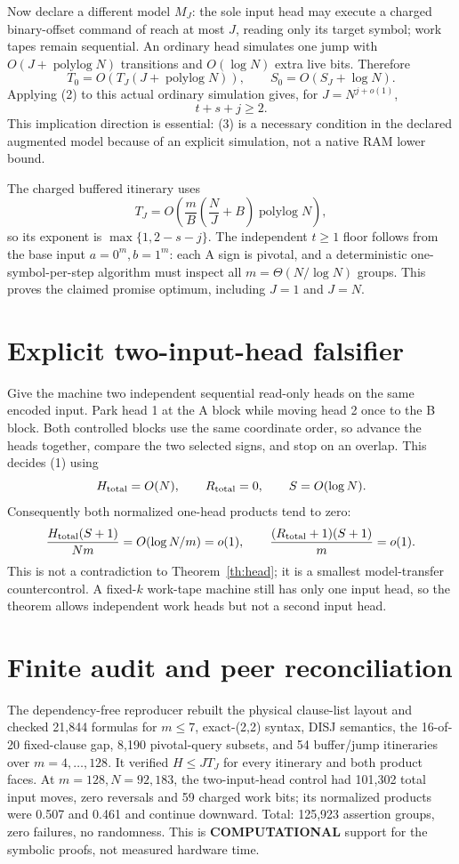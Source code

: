 \documentclass[11pt]{article}
\begin{document}
Now declare a different model \(M_J\): the sole input head may execute a charged binary-offset command of reach at most \(J\), reading only its target symbol; work tapes remain sequential. An ordinary head simulates one jump with \(O(J+\operatorname{polylog}N)\) transitions and \(O(\log N)\) extra live bits. Therefore
\[
T_0=O(T_J(J+\operatorname{polylog}N)),\qquad S_0=O(S_J+\log N).
\]
Applying (2) to this actual ordinary simulation gives, for \(J=N^{j+o(1)}\),
\[
t+s+j\ge2. \tag{3}
\]
This implication direction is essential: (3) is a necessary condition in the declared augmented model because of an explicit simulation, not a native RAM lower bound.

The charged buffered itinerary uses
\[
T_J=O\left(\frac mB\left(\frac NJ+B\right)\operatorname{polylog}N\right),
\]
so its exponent is \(\max\{1,2-s-j\}\). The independent \(t\ge1\) floor follows from the base input \(a=0^m,b=1^m\): each A sign is pivotal, and a deterministic one-symbol-per-step algorithm must inspect all \(m=\Theta(N/\log N)\) groups. This proves the claimed promise optimum, including \(J=1\) and \(J=N\).

\section{Explicit two-input-head falsifier}
Give the machine two independent sequential read-only heads on the same encoded input. Park head 1 at the A block while moving head 2 once to the B block. Both controlled blocks use the same coordinate order, so advance the heads together, compare the two selected signs, and stop on an overlap. This decides (1) using
\[
H_{\rm total}=O(N),\qquad R_{\rm total}=0,\qquad S=O(\log N).
\]
Consequently both normalized one-head products tend to zero:
\[
\frac{H_{\rm total}(S+1)}{Nm}=O(\log N/m)=o(1),\qquad
\frac{(R_{\rm total}+1)(S+1)}m=o(1).
\]
This is not a contradiction to Theorem~\ref{th:head}; it is a smallest model-transfer countercontrol. A fixed-\(k\) work-tape machine still has only one input head, so the theorem allows independent work heads but not a second input head.

\section{Finite audit and peer reconciliation}
The dependency-free reproducer rebuilt the physical clause-list layout and checked 21,844 formulas for \(m\le7\), exact-(2,2) syntax, DISJ semantics, the 16-of-20 fixed-clause gap, 8,190 pivotal-query subsets, and 54 buffer/jump itineraries over \(m=4,\ldots,128\). It verified \(H\le JT_J\) for every itinerary and both product faces. At \(m=128,N=92{,}183\), the two-input-head control had 101,302 total input moves, zero reversals and 59 charged work bits; its normalized products were 0.507 and 0.461 and continue downward. Total: 125,923 assertion groups, zero failures, no randomness. This is \textbf{COMPUTATIONAL} support for the symbolic proofs, not measured hardware time.
\end{document}
